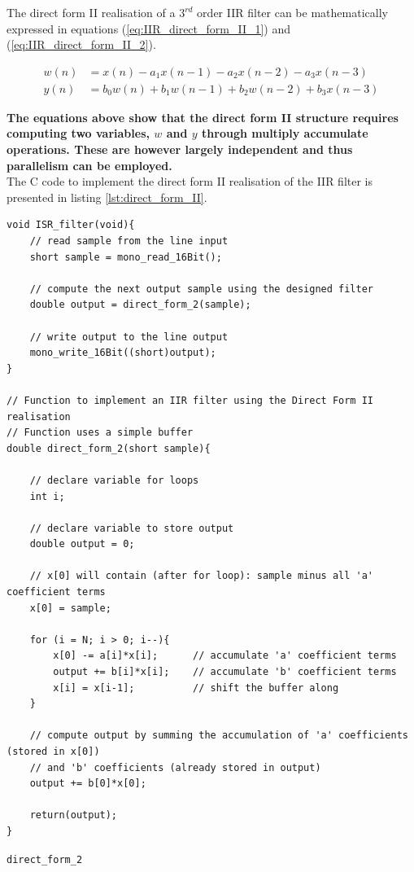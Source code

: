 \documentclass{article}
\begin{document}
The direct form II realisation of a $3^{rd}$ order IIR filter can be mathematically expressed in equations (\ref{eq:IIR_direct_form_II_1}) and (\ref{eq:IIR_direct_form_II_2}).

\begin{align}
    w(n) &= x(n) - a_{1}x(n-1) - a_{2}x(n-2) - a_{3}x(n-3) \label{eq:IIR_direct_form_II_1}\\
    y(n) &= b_{0}w(n) + b_{1}w(n-1) + b_{2}w(n-2) + b_{3}x(n-3) \label{eq:IIR_direct_form_II_2}
\end{align}

\textbf{The equations above show that the direct form II structure requires computing two variables, $w$ and $y$ through multiply accumulate operations. These are however largely independent and thus parallelism can be employed.} \\

The C code to implement the direct form II realisation of the IIR filter is presented in listing \ref{lst:direct_form_II}. 

\begin{listing}[H]
\begin{verbatim}
void ISR_filter(void){
    // read sample from the line input				
    short sample = mono_read_16Bit();
    
    // compute the next output sample using the designed filter
    double output = direct_form_2(sample);
    
    // write output to the line output
    mono_write_16Bit((short)output);
}

// Function to implement an IIR filter using the Direct Form II realisation
// Function uses a simple buffer
double direct_form_2(short sample){

    // declare variable for loops 
    int i;
    
    // declare variable to store output
    double output = 0;
    
    // x[0] will contain (after for loop): sample minus all 'a' coefficient terms
    x[0] = sample;
    
    for (i = N; i > 0; i--){
        x[0] -= a[i]*x[i];      // accumulate 'a' coefficient terms
        output += b[i]*x[i];    // accumulate 'b' coefficient terms
        x[i] = x[i-1];          // shift the buffer along
    }
    
    // compute output by summing the accumulation of 'a' coefficients (stored in x[0])
    // and 'b' coefficients (already stored in output)
    output += b[0]*x[0];
    
    return(output);
}
\end{verbatim}
\caption{{\tt direct\_form\_2}} 
\label{lst:direct_form_II}
\end{listing}
\end{document}
